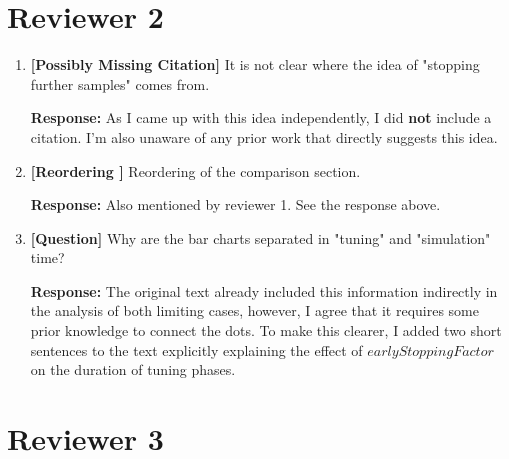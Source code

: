 \documentclass[12pt,a4paper]{article}
\begin{document}
\section*{Reviewer 2}
\begin{enumerate}[label=\textbf{Comment \arabic*:}, itemsep=0.8em]
    \item \textbf{[Possibly Missing Citation]} It is not clear where the idea of "stopping further samples" comes from.

          \textbf{Response:} As I came up with this idea independently, I did \textbf{not} include a citation. I'm also unaware of any prior work that directly suggests this idea.

    \item \textbf{[Reordering ]} Reordering of the comparison section.

          \textbf{Response:} Also mentioned by reviewer 1. See the response above.

    \item \textbf{[Question]} Why are the bar charts separated in "tuning" and "simulation" time?

          \textbf{Response:} The original text already included this information indirectly in the analysis of both limiting cases, however, I agree that it requires some prior knowledge to connect the dots.
          To make this clearer, I added two short sentences to the text explicitly explaining the effect of $earlyStoppingFactor$ on the duration of tuning phases.

\end{enumerate}

\section*{Reviewer 3}
\end{document}
